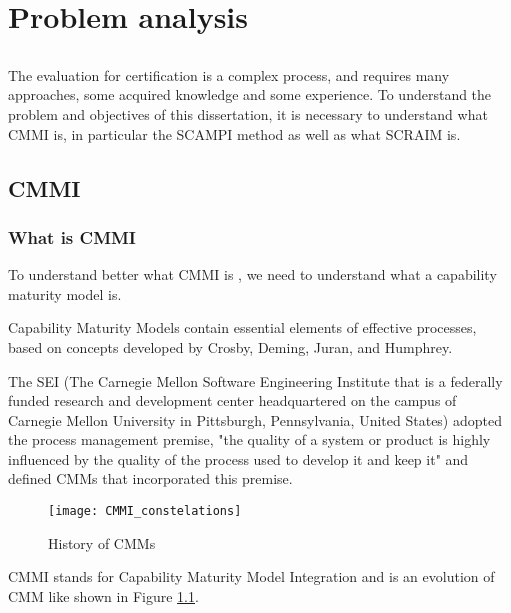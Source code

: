 \chapter{Problem analysis} \label{chap:problem}

\section*{}

The evaluation for certification is a complex process, and requires many approaches, some acquired knowledge and some experience. To understand the problem and objectives of this dissertation, it is necessary to understand what CMMI is, in particular the SCAMPI \citep{SCAMPITeam2013} method as well as what SCRAIM is.

\section{CMMI}

\subsection{What is CMMI}

To understand better what CMMI is \citep{Development2010}, we need to understand what a capability maturity model is.

Capability Maturity Models\citep{fraser2002use} contain essential elements of effective processes, based on concepts developed by Crosby, Deming, Juran, and Humphrey.

The SEI (The Carnegie Mellon Software Engineering Institute that is a federally funded research and development center headquartered on the campus of Carnegie Mellon University in Pittsburgh, Pennsylvania, United States) adopted the process management premise, "the quality of a system or product is highly influenced by the quality of the process used to develop it and keep it" and defined CMMs that incorporated this premise.

\begin{figure}[h]
	\begin{center}
		\leavevmode
		\texttt{[image: CMMI\_constelations]}
		\caption{History of CMMs}
		\label{fig:historycmmi}
	\end{center}
\end{figure}


CMMI stands for Capability Maturity Model Integration and is an evolution of CMM like shown in Figure \ref{fig:historycmmi}.

